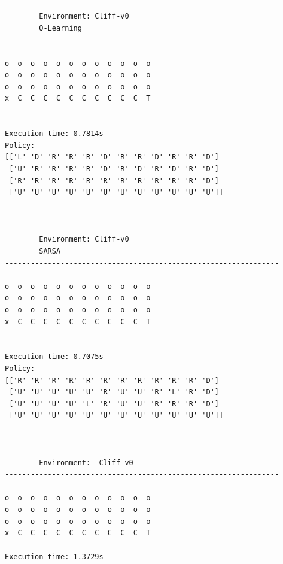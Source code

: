 \documentclass[11pt,oneside]{book}
\begin{document}
    \begin{Verbatim}[commandchars=\\\{\}]

----------------------------------------------------------------
        Environment: Cliff-v0
        Q-Learning
----------------------------------------------------------------

o  o  o  o  o  o  o  o  o  o  o  o
o  o  o  o  o  o  o  o  o  o  o  o
o  o  o  o  o  o  o  o  o  o  o  o
x  C  C  C  C  C  C  C  C  C  C  T


Execution time: 0.7814s
Policy:
[['L' 'D' 'R' 'R' 'R' 'D' 'R' 'R' 'D' 'R' 'R' 'D']
 ['U' 'R' 'R' 'R' 'R' 'D' 'R' 'D' 'R' 'D' 'R' 'D']
 ['R' 'R' 'R' 'R' 'R' 'R' 'R' 'R' 'R' 'R' 'R' 'D']
 ['U' 'U' 'U' 'U' 'U' 'U' 'U' 'U' 'U' 'U' 'U' 'U']]


----------------------------------------------------------------
        Environment: Cliff-v0
        SARSA
----------------------------------------------------------------

o  o  o  o  o  o  o  o  o  o  o  o
o  o  o  o  o  o  o  o  o  o  o  o
o  o  o  o  o  o  o  o  o  o  o  o
x  C  C  C  C  C  C  C  C  C  C  T


Execution time: 0.7075s
Policy:
[['R' 'R' 'R' 'R' 'R' 'R' 'R' 'R' 'R' 'R' 'R' 'D']
 ['U' 'U' 'U' 'U' 'U' 'R' 'U' 'U' 'R' 'L' 'R' 'D']
 ['U' 'U' 'U' 'U' 'L' 'R' 'U' 'U' 'R' 'R' 'R' 'D']
 ['U' 'U' 'U' 'U' 'U' 'U' 'U' 'U' 'U' 'U' 'U' 'U']]


----------------------------------------------------------------
        Environment:  Cliff-v0
----------------------------------------------------------------

o  o  o  o  o  o  o  o  o  o  o  o
o  o  o  o  o  o  o  o  o  o  o  o
o  o  o  o  o  o  o  o  o  o  o  o
x  C  C  C  C  C  C  C  C  C  C  T

Execution time: 1.3729s
    \end{Verbatim}

    \begin{center}
    \end{center}

    \begin{center}
    \end{center}
\end{document}
